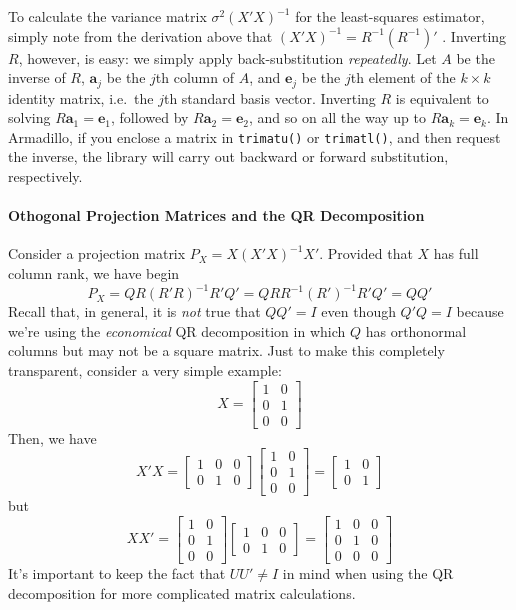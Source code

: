 To calculate the variance matrix $\sigma^2 (X'X)^{-1}$ for the least-squares estimator, simply note from the derivation above that $(X'X)^{-1} = R^{-1} (R^{-1})'$ . Inverting $R$, however, is easy: we simply apply back-substitution \emph{repeatedly}. Let $A$ be the inverse of $R$, $\mathbf{a}_j$ be the $j$th column of $A$, and $\mathbf{e}_j$ be the $j$th element of the $k\times k$ identity matrix, i.e.\ the $j$th standard basis vector. Inverting $R$ is equivalent to solving $R \mathbf{a}_1 = \mathbf{e}_1$, followed by $R \mathbf{a}_2 = \mathbf{e}_2$, and so on all the way up to $R \mathbf{a}_k = \mathbf{e}_k$. In Armadillo, if you enclose a matrix in \texttt{trimatu()} or \texttt{trimatl()}, and then request the inverse, the library will carry out backward or forward substitution, respectively.

\paragraph{Othogonal Projection Matrices and the QR Decomposition}
Consider a projection matrix $P_X = X (X'X)^{-1}X'$. Provided that $X$ has full column rank, we have
begin
  $$P_X  = QR(R'R)^{-1}R'Q' = QRR^{-1} (R')^{-1}R'Q' = QQ'$$
Recall that, in general, it is \emph{not} true that $QQ' = I$ even though $Q'Q = I$ because we're using the \emph{economical} QR decomposition in which $Q$ has orthonormal columns but may not be a square matrix. Just to make this completely transparent, consider a very simple example:
	$$X = \left[ \begin{array}
		{cc} 1 & 0 \\ 0 & 1 \\ 0 & 0
	\end{array}\right]$$
Then, we have
	$$X'X = \left[\begin{array}
		{ccc} 1& 0 & 0 \\ 0 & 1 & 0
	\end{array} \right]\left[ \begin{array}
		{cc} 1 & 0 \\ 0 & 1 \\ 0 & 0
	\end{array}\right] = \left[\begin{array}
		{cc} 1 & 0 \\ 0 & 1
	\end{array} \right]$$
but 
	$$XX' = \left[ \begin{array}
		{cc} 1 & 0 \\ 0 & 1 \\ 0 & 0
	\end{array}\right]\left[\begin{array}
		{ccc} 1& 0 & 0 \\ 0 & 1 & 0
	\end{array} \right] = \left[\begin{array}
		{ccc} 1 & 0 & 0 \\ 0 & 1 & 0 \\ 0 & 0 & 0
	\end{array} \right]$$
It's important to keep the fact that $UU' \neq I$ in mind when using the QR decomposition for more complicated matrix calculations.

